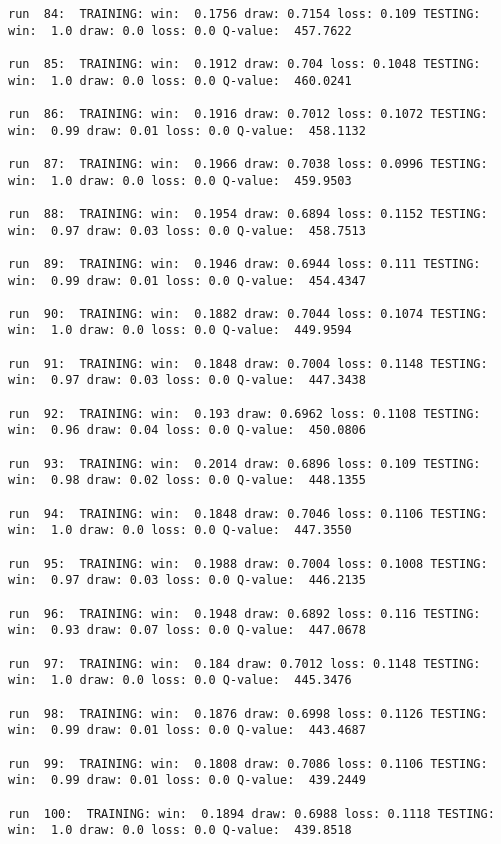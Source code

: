 \documentclass[11pt]{article}
\begin{document}
\begin{Verbatim}[commandchars=\\\{\}]
run  84:  TRAINING: win:  0.1756 draw: 0.7154 loss: 0.109 TESTING: win:  1.0 draw: 0.0 loss: 0.0 Q-value:  457.7622

run  85:  TRAINING: win:  0.1912 draw: 0.704 loss: 0.1048 TESTING: win:  1.0 draw: 0.0 loss: 0.0 Q-value:  460.0241

run  86:  TRAINING: win:  0.1916 draw: 0.7012 loss: 0.1072 TESTING: win:  0.99 draw: 0.01 loss: 0.0 Q-value:  458.1132

run  87:  TRAINING: win:  0.1966 draw: 0.7038 loss: 0.0996 TESTING: win:  1.0 draw: 0.0 loss: 0.0 Q-value:  459.9503

run  88:  TRAINING: win:  0.1954 draw: 0.6894 loss: 0.1152 TESTING: win:  0.97 draw: 0.03 loss: 0.0 Q-value:  458.7513

run  89:  TRAINING: win:  0.1946 draw: 0.6944 loss: 0.111 TESTING: win:  0.99 draw: 0.01 loss: 0.0 Q-value:  454.4347

run  90:  TRAINING: win:  0.1882 draw: 0.7044 loss: 0.1074 TESTING: win:  1.0 draw: 0.0 loss: 0.0 Q-value:  449.9594

run  91:  TRAINING: win:  0.1848 draw: 0.7004 loss: 0.1148 TESTING: win:  0.97 draw: 0.03 loss: 0.0 Q-value:  447.3438

run  92:  TRAINING: win:  0.193 draw: 0.6962 loss: 0.1108 TESTING: win:  0.96 draw: 0.04 loss: 0.0 Q-value:  450.0806

run  93:  TRAINING: win:  0.2014 draw: 0.6896 loss: 0.109 TESTING: win:  0.98 draw: 0.02 loss: 0.0 Q-value:  448.1355

run  94:  TRAINING: win:  0.1848 draw: 0.7046 loss: 0.1106 TESTING: win:  1.0 draw: 0.0 loss: 0.0 Q-value:  447.3550

run  95:  TRAINING: win:  0.1988 draw: 0.7004 loss: 0.1008 TESTING: win:  0.97 draw: 0.03 loss: 0.0 Q-value:  446.2135

run  96:  TRAINING: win:  0.1948 draw: 0.6892 loss: 0.116 TESTING: win:  0.93 draw: 0.07 loss: 0.0 Q-value:  447.0678

run  97:  TRAINING: win:  0.184 draw: 0.7012 loss: 0.1148 TESTING: win:  1.0 draw: 0.0 loss: 0.0 Q-value:  445.3476

run  98:  TRAINING: win:  0.1876 draw: 0.6998 loss: 0.1126 TESTING: win:  0.99 draw: 0.01 loss: 0.0 Q-value:  443.4687

run  99:  TRAINING: win:  0.1808 draw: 0.7086 loss: 0.1106 TESTING: win:  0.99 draw: 0.01 loss: 0.0 Q-value:  439.2449

run  100:  TRAINING: win:  0.1894 draw: 0.6988 loss: 0.1118 TESTING: win:  1.0 draw: 0.0 loss: 0.0 Q-value:  439.8518


\end{Verbatim}
\end{document}
